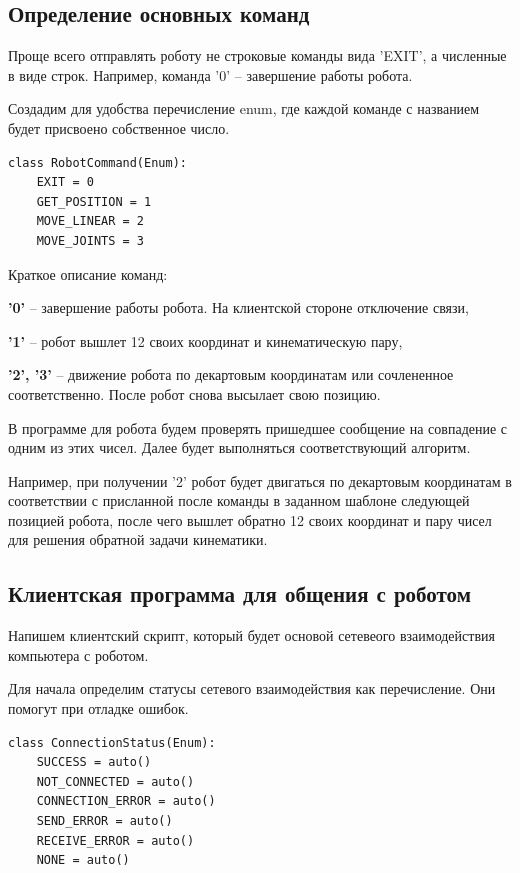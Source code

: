 \documentclass[a4paper,14pt]{extarticle}
\begin{document}
\subsection{Определение основных команд}
Проще всего отправлять роботу не строковые команды вида 'EXIT',
а численные в виде строк. Например, команда '0' -- завершение работы
робота.


Создадим для удобства перечисление enum, где каждой
команде с названием будет присвоено собственное число.
\begin{lstlisting}[label=robocmd, caption={Определение перечисления с командами для робота.}]
class RobotCommand(Enum):
    EXIT = 0
    GET_POSITION = 1
    MOVE_LINEAR = 2
    MOVE_JOINTS = 3
\end{lstlisting}


Краткое описание команд:
\begin{compactitem}
    \item \textbf{'0'} -- завершение работы робота. На клиентской стороне отключение связи,
    \item \textbf{'1'} -- робот вышлет 12 своих координат и кинематическую пару,
    \item \textbf{'2', '3'} -- движение робота по декартовым координатам или сочлененное соответственно.
    После робот снова высылает свою позицию.
\end{compactitem}


В программе для робота будем проверять пришедшее сообщение
на совпадение с одним из этих чисел. Далее будет
выполняться соответствующий алгоритм.


Например, при получении
'2' робот будет двигаться по декартовым координатам в соответствии
с присланной после команды в заданном шаблоне следующей позицией робота, после чего
вышлет обратно 12 своих координат и пару чисел для решения
обратной задачи кинематики.


\subsection{Клиентская программа для общения с роботом}
Напишем клиентский скрипт, который будет основой сетевеого взаимодействия
компьютера с роботом.


Для начала определим статусы сетевого взаимодействия как перечисление.
Они помогут при отладке ошибок.
\begin{lstlisting}[label=lst:constat, caption={Определение перечисления статусов соединения компьютера с роботом.}]
class ConnectionStatus(Enum):
    SUCCESS = auto()
    NOT_CONNECTED = auto()
    CONNECTION_ERROR = auto()
    SEND_ERROR = auto()
    RECEIVE_ERROR = auto()
    NONE = auto()
\end{lstlisting}
\end{document}
